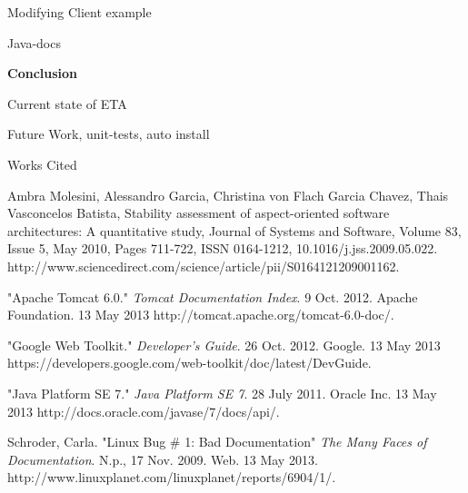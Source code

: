 \documentclass[a4paper,12pt]{texMemo}
\newcommand{\bibent}{\noindent \hangindent 40pt}
\newenvironment{workscited}{ \doublespacing \newpage \begin{center} Works Cited \end{center}}{\newpage }
\begin{document}
\begin{outline}
\begin{outline}
	\item { Modifying Client example}\\
	\item { Java-docs} \\
	\end{outline}
\item {\bf Conclusion}
	\begin{outline}
	\item { Current state of ETA} \\
	\item { Future Work, unit-tests, auto install} \\
	\end{outline}
\end{outline}





\setlength{\parindent}{0.5in}
 
\begin{workscited}

  \bibent
 Ambra Molesini, Alessandro Garcia, Christina von Flach Garcia Chavez, Thais Vasconcelos Batista, Stability assessment of aspect-oriented software architectures: A quantitative study, Journal of Systems and Software, Volume 83, Issue 5, May 2010, Pages 711-722, ISSN 0164-1212, 10.1016/j.jss.2009.05.022.
\\http://www.sciencedirect.com/science/article/pii/S0164121209001162. 

 \bibent
 "Apache Tomcat 6.0." \textit{Tomcat Documentation Index}. 9 Oct. 2012. Apache Foundation.  13 May 2013 http://tomcat.apache.org/tomcat-6.0-doc/. 

 \bibent
 "Google Web Toolkit." \textit{Developer's Guide}. 26 Oct. 2012. Google. 13 May 2013 \\https://developers.google.com/web-toolkit/doc/latest/DevGuide. 

 \bibent
 "Java Platform SE 7." \textit{Java Platform SE 7}. 28 July 2011. Oracle Inc. 13 May 2013 http://docs.oracle.com/javase/7/docs/api/. 


 \bibent
  Schroder, Carla. "Linux Bug \# 1: Bad Documentation" \textit{The Many Faces of Documentation}. N.p., 17 Nov. 2009. Web. 13 May 2013.\\ http://www.linuxplanet.com/linuxplanet/reports/6904/1/. 


 \end{workscited}
\end{document}
